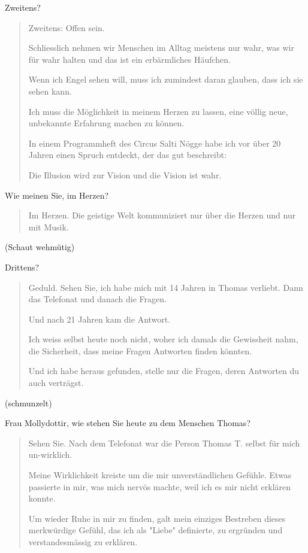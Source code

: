 \documentclass[10pt,titlepage,a5paper]{book}
\newenvironment{tg}{\begin{quote}\em}{\end{quote}}
\begin{document}
Zweitens?

\begin{tg}

Zweitens: Offen sein.

Schliesslich nehmen wir Menschen im Alltag meistens nur wahr, was wir für wahr halten und das ist ein erbärmliches Häufchen.

Wenn ich Engel sehen will, muss ich zumindest daran glauben, dass ich sie sehen kann.

Ich muss die Möglichkeit in meinem Herzen zu lassen, eine völlig neue, unbekannte Erfahrung machen zu können.

In einem Programmheft des Circus Salti Nögge habe ich vor über 20 Jahren einen Spruch entdeckt, der das gut beschreibt:

Die Illusion wird zur Vision und die Vision ist wahr.

\end{tg}

Wie meinen Sie, im Herzen?

\begin{tg}

Im Herzen. Die geistige Welt kommuniziert nur über die Herzen und nur mit Musik.

\end{tg}

(Schaut wehmütig)

Drittens?

\begin{tg}

Geduld. Sehen Sie, ich habe mich mit 14 Jahren in Thomas verliebt. Dann das Telefonat und danach die Fragen. 

Und nach 21 Jahren kam die Antwort.

Ich weiss selbst heute noch nicht, woher ich damals die Gewissheit nahm, die Sicherheit, dass meine Fragen Antworten finden könnten. 

Und ich habe heraus gefunden, stelle nur die Fragen, deren Antworten du auch verträgst.

\end{tg}

(schmunzelt)

Frau Mollydottir, wie stehen Sie heute zu dem Menschen Thomas?

\begin{tg}

Sehen Sie. Nach dem Telefonat war die Person Thomas T. selbst für mich un-wirklich. 

Meine Wirklichkeit kreiste um die mir unverständlichen Gefühle. Etwas passierte in mir, was mich nervös machte, weil ich es mir nicht erklären konnte.

Um wieder Ruhe in mir zu finden, galt mein einziges Bestreben dieses merkwürdige Gefühl, das ich als "Liebe" definierte, zu ergründen und verstandesmässig zu erklären.

\end{tg}
\end{document}
